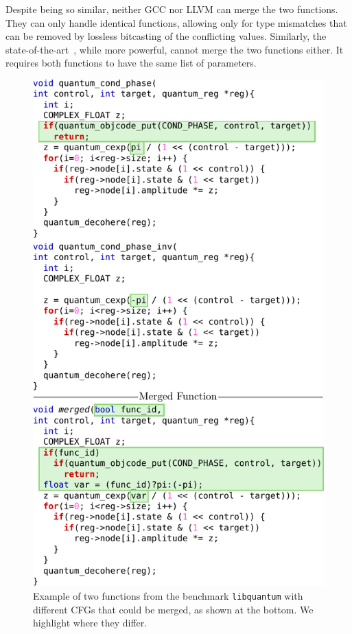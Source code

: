 Despite being so similar, neither GCC nor LLVM can merge the two functions.
They can only handle identical functions, allowing only for type mismatches
that can be removed by lossless bitcasting of the conflicting values.
Similarly, the state-of-the-art~\cite{edler14}, while more powerful, cannot
merge the two functions either. It requires both functions to have the same list
of parameters.

\begin{figure}[t!]
  \centering
  \includegraphics[width=\linewidth]{figs/libquantum-example.pdf}
    \caption{Example of two functions from the benchmark \texttt{libquantum}
	  with different CFGs that could be merged, as shown at the bottom.
      We highlight where they differ.}
  \label{fig:libquantum-example}
\end{figure}

